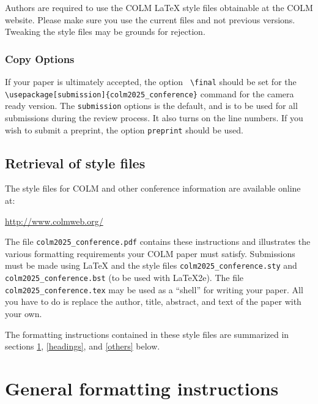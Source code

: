 \documentclass{article} %
\begin{document}

Authors are required to use the COLM \LaTeX{} style files obtainable at the
COLM website. Please make sure you use the current files and
not previous versions. Tweaking the style files may be grounds for rejection.

\subsubsection{Copy Options}

If your paper is ultimately accepted, the option {\tt
  {\textbackslash}final} should be set  for the {\tt {\textbackslash}usepackage[submission]\{colm2025\_conference\}} command for the camera ready version. The {\tt submission} options is the default, and is to be used for all submissions during the review process. It also turns on the line numbers. If you wish to submit a preprint, the option {\tt preprint} should be used.
  
  

\subsection{Retrieval of style files}

The style files for COLM and other conference information are available online at:
\begin{center}
   \url{http://www.colmweb.org/}
\end{center}
The file \verb+colm2025_conference.pdf+ contains these
instructions and illustrates the
various formatting requirements your COLM paper must satisfy.
Submissions must be made using \LaTeX{} and the style files
\verb+colm2025_conference.sty+ and \verb+colm2025_conference.bst+ (to be used with \LaTeX{}2e). The file
\verb+colm2025_conference.tex+ may be used as a ``shell'' for writing your paper. All you
have to do is replace the author, title, abstract, and text of the paper with
your own.

The formatting instructions contained in these style files are summarized in
sections \ref{gen_inst}, \ref{headings}, and \ref{others} below.

\section{General formatting instructions}
\label{gen_inst}
\end{document}

